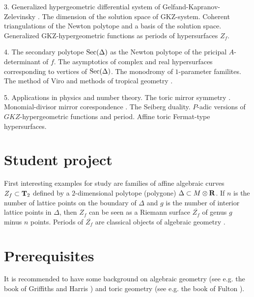 3. Generalized hypergeometric differential system of  
Gelfand-Kapranov-Zelevin\-sky \cite{GKZ1}. 
The dimension of the solution space of 
GKZ-system. Coherent triangulations of the Newton polytope and a basis 
of the solution space. Generalized GKZ-hypergeometric functions as periods
of hypersurfaces $Z_f$. 


4. The secondary polytope ${\rm Sec}(\Delta)$ as the Newton polytope of the 
pricipal $A$-determinant of $f$.  The asymptotics  of complex and real 
hypersurfaces corresponding to vertices of  ${\rm Sec}(\Delta)$. The monodromy 
of $1$-parameter familites. The 
method of Viro and methods of tropical geometry \cite{Mikh}. 


5. Applications in physics and number theory. 
The toric mirror symmetry \cite{BA}. 
Monomial-divisor mirror corespondence \cite{AGM}.
The Seiberg duality. $P$-adic versions of $GKZ$-hypergeometric functions 
and period. Affine toric Fermat-type hypersurfaces. 




\section{Student project} 

First interesting examples for study are families of affine 
algebraic curves $Z_f \subset {\bf T}_2$ defined by a 
$2$-dimensional polytope (polygone) $\Delta \subset M \otimes {\bf R}$. 
If $n$ is the number of lattice points on the boundary of $\Delta$ 
and $g$ is the number of interior lattice points in  $\Delta$, then 
$Z_f$ can be seen as a Riemann surface $\overline{Z_f}$ 
of genus $g$ minus $n$ points.
Periods of $\overline{Z_f}$ are classical objects of algebraic geometry 
\cite{clem}.



\section{Prerequisites}

It is recommended to have some background on algebraic geometry 
(see e.g. the book of Griffiths and Harris \cite{GH}) and toric
geometry (see e.g. the book of Fulton \cite{F}). 




